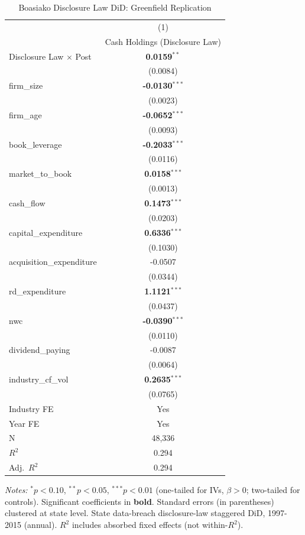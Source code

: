 \documentclass[11pt,a4paper]{article}
\begin{document}
\clearpage
\begin{table}[htbp]
\centering
\caption{Boasiako Disclosure Law DiD: Greenfield Replication}
\label{tab:h1_5_disclosure_law_did}
\scriptsize
\begin{tabular}{lc}
\toprule
 & (1) \\
 & Cash Holdings (Disclosure Law) \\
\midrule
Disclosure Law $\times$ Post & \textbf{0.0159}$^{**}$ \\
 & (0.0084) \\
\midrule
firm\_size & \textbf{-0.0130}$^{***}$ \\
 & (0.0023) \\
firm\_age & \textbf{-0.0652}$^{***}$ \\
 & (0.0093) \\
book\_leverage & \textbf{-0.2033}$^{***}$ \\
 & (0.0116) \\
market\_to\_book & \textbf{0.0158}$^{***}$ \\
 & (0.0013) \\
cash\_flow & \textbf{0.1473}$^{***}$ \\
 & (0.0203) \\
capital\_expenditure & \textbf{0.6336}$^{***}$ \\
 & (0.1030) \\
acquisition\_expenditure & -0.0507 \\
 & (0.0344) \\
rd\_expenditure & \textbf{1.1121}$^{***}$ \\
 & (0.0437) \\
nwc & \textbf{-0.0390}$^{***}$ \\
 & (0.0110) \\
dividend\_paying & -0.0087 \\
 & (0.0064) \\
industry\_cf\_vol & \textbf{0.2635}$^{***}$ \\
 & (0.0765) \\
\midrule
Industry FE & Yes \\
Year FE & Yes \\
\midrule
N & 48,336 \\
$R^2$ & 0.294 \\
Adj.~$R^2$ & 0.294 \\
\bottomrule
\end{tabular}
\begin{minipage}{\linewidth}
\vspace{2pt}\scriptsize
\textit{Notes:} $^{*}p<0.10$, $^{**}p<0.05$, $^{***}p<0.01$ (one-tailed for IVs, $\beta > 0$; two-tailed for controls).
 Significant coefficients in \textbf{bold}.
 Standard errors (in parentheses) clustered at state level.
 State data-breach disclosure-law staggered DiD, 1997-2015 (annual).
 $R^2$ includes absorbed fixed effects (not within-$R^2$).
\end{minipage}
\end{table}
\end{document}
